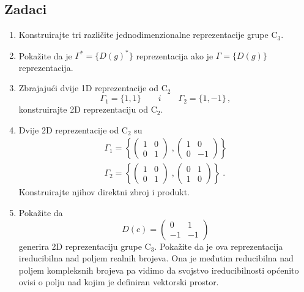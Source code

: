 \subsection*{Zadaci}

\begin{enumerate}[label=\arabic{chapter}.\arabic*.]

\item Konstruirajte tri različite jednodimenzionalne reprezentacije
    grupe C$_3$. 

\item \label{zad:complex} Pokažite da je $\Gamma^* = \{ D(g)^* \}$ reprezentacija ako je
                     $\Gamma   = \{ D(g)   \}$ reprezentacija.

\item Zbrajajući dvije 1D reprezentacije od C$_2$
\begin{equation}
 \Gamma_1 = \{1, 1\} \qquad i \qquad \Gamma_2 = \{1, -1\} \,,
\end{equation}
konstruirajte 2D reprezentaciju od C$_2$. 

\item Dvije 2D reprezentacije od C$_2$ su
\begin{align*}
\Gamma_1 = \left\{
\begin{pmatrix}
 1 & 0 \\ 0 & 1
\end{pmatrix}\;,
\begin{pmatrix}
 1 & 0 \\ 0 & -1
\end{pmatrix}\right\} \\
\Gamma_2 = \left\{
\begin{pmatrix}
 1 & 0 \\ 0 & 1
\end{pmatrix}\;,
\begin{pmatrix}
 0 & 1 \\ 1 & 0
\end{pmatrix}\right\}\;.
\end{align*}
Konstruirajte njihov direktni zbroj i produkt.

\item Pokažite da
\begin{equation*}
 D(c) = 
\begin{pmatrix}
0 & 1 \\
-1 & -1
\end{pmatrix}
\end{equation*}
generira 2D reprezentaciju grupe C$_3$. Pokažite da je ova reprezentacija
ireducibilna nad poljem realnih brojeva. 
Ona je međutim reducibilna nad poljem kompleksnih brojeva pa
vidimo da svojstvo ireducibilnosti općenito ovisi o polju nad kojim je
definiran vektorski prostor.


\end{enumerate}
